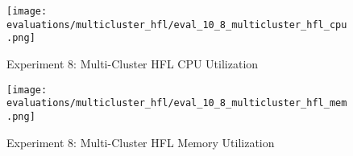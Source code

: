 \begin{figure}[p]
    \begin{adjustwidth}{-0.2\paperwidth}{-0.2\paperwidth}
        \centering
        \texttt{[image: evaluations/multicluster\_hfl/eval\_10\_8\_multicluster\_hfl\_cpu.png]}
        \caption{Experiment 8: Multi-Cluster HFL CPU Utilization}
        \label{fig:eval_8_cpu}
    \end{adjustwidth}

    \begin{adjustwidth}{-0.2\paperwidth}{-0.2\paperwidth}
        \centering
        \texttt{[image: evaluations/multicluster\_hfl/eval\_10\_8\_multicluster\_hfl\_mem.png]}
        \caption{Experiment 8: Multi-Cluster HFL Memory Utilization}
        \label{fig:eval_8_mem}
    \end{adjustwidth}
\end{figure}